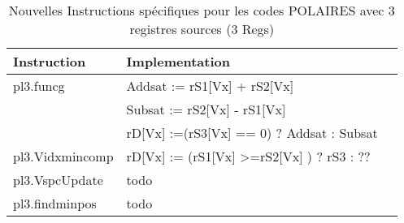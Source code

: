 
\begin{table}[tb]
  \centering
  
      \begin{tabular}{l || l l }
      \toprule
          Instruction & Implementation \\
        \midrule      
          pl3.funcg         &    Addsat := rS1{[}Vx{]} + rS2{[}Vx{]} \\
          
                            &    Subsat := rS2{[}Vx{]} - rS1{[}Vx{]} \\
            
                            &    rD{[}Vx{]} :=(rS3{[}Vx{]} == 0) ? Addsat : Subsat  \\
            \midrule
            pl3.Vidxmincomp &    rD{[}Vx{]} := (rS1{[}Vx{]} >=rS2{[}Vx{]} ) ? rS3 : ?? \\
            \midrule
            pl3.VspcUpdate  &   todo \\
            \midrule
            pl3.findminpos & todo \\
      \bottomrule
      \end{tabular}
  
    \caption{Nouvelles Instructions spécifiques pour les codes POLAIRES avec 
  3 registres sources (3 Regs) }

  \label{tab:instrus_polar_3reg}
  \end{table}
